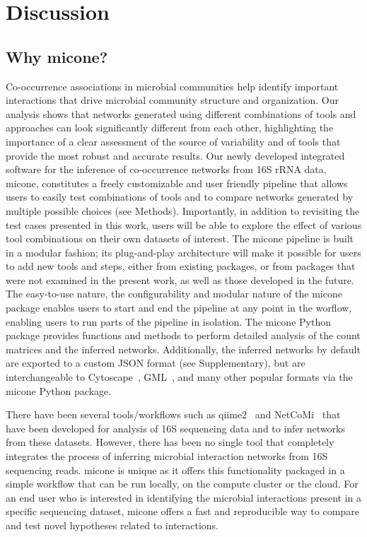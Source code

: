 
\section*{Discussion}

  \subsection*{Why \ac{micone}?}

  Co-occurrence associations in microbial communities help identify important interactions that drive microbial community structure and organization.
  Our analysis shows that networks generated using different combinations of tools and approaches can look significantly different from each other, highlighting the importance of a clear assessment of the source of variability and of tools that provide the most robust and accurate results.
  Our newly developed integrated software for the inference of co-occurrence networks from 16S rRNA data, \ac{micone}, constitutes a freely customizable and user friendly pipeline that allows users to easily test combinations of tools and to compare networks generated by multiple possible choices (see Methods).
  Importantly, in addition to revisiting the test cases presented in this work, users will be able to explore the effect of various tool combinations on their own datasets of interest.
  The \ac{micone} pipeline is built in a modular fashion; its plug-and-play architecture will make it possible for users to add new tools and steps, either from existing packages, or from packages that were not examined in the present work, as well as those developed in the future.
  The easy-to-use nature, the configurability and modular nature of the \ac{micone} package enables users to start and end the pipeline at any point in the worflow, enabling users to run parts of the pipeline in isolation.
  The \ac{micone} Python package provides functions and methods to perform detailed analysis of the count matrices and the inferred networks.
  Additionally, the inferred networks by default are exported to a custom JSON format (see Supplementary), but are interchangeable to Cytoscape~\cite{shannonCytoscapeSoftwareEnvironment2003}, GML~\cite{himsoltGMLPortableGraph2010}, and many other popular formats via the \ac{micone} Python package.

  There have been several tools/workflows such as \ac{qiime2}~\cite{bolyenReproducibleInteractiveScalable2019} and NetCoMi~\cite{peschelNetCoMiNetworkConstruction2020} that have been developed for analysis of 16S sequencing data and to infer networks from these datasets.
  However, there has been no single tool that completely integrates the process of inferring microbial interaction networks from 16S sequencing reads.
  \ac{micone} is unique as it offers this functionality packaged in a simple workflow that can be run locally, on the compute cluster or the cloud.
  For an end user who is interested in identifying the microbial interactions present in a specific sequencing dataset, \ac{micone} offers a fast and reproducible way to compare and test novel hypotheses related to interactions.

